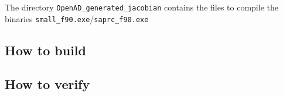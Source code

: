 \noindent The directory \texttt{OpenAD\_generated\_jacobian} contains the files to compile the binaries \texttt{small\_f90.exe}/\texttt{saprc\_f90.exe} 

\subsection{How to build}
\subsection{How to verify}
%
%
%
%



